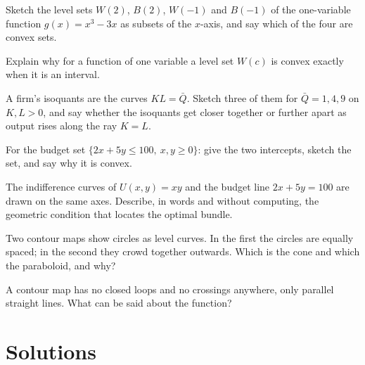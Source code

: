 \begin{problems}[resume]
  \item Sketch the level sets $W(2)$, $B(2)$, $W(-1)$ and $B(-1)$ of the
        one-variable function $g(x)=x^{3}-3x$ as subsets of the $x$-axis,
        and say which of the four are convex sets.
  \item Explain why for a function of one variable a level set
        $W(c)$ is convex exactly when it is an interval.
  \item A firm's isoquants are the curves $KL=\bar Q$. Sketch three of them
        for $\bar Q=1,4,9$ on $K,L>0$, and say whether the isoquants get
        closer together or further apart as output rises along the ray
        $K=L$.
  \item For the budget set $\{2x+5y\le100,\ x,y\ge0\}$: give the two
        intercepts, sketch the set, and say why it is convex.
  \item The indifference curves of $U(x,y)=xy$ and the budget line
        $2x+5y=100$ are drawn on the same axes. Describe, in words and
        without computing, the geometric condition that locates the optimal
        bundle.
  \item Two contour maps show circles as level curves. In the first the
        circles are equally spaced; in the second they crowd together
        outwards. Which is the cone and which the paraboloid, and why?
  \item A contour map has no closed loops and no crossings anywhere, only
        parallel straight lines. What can be said about the function?
\end{problems}

\section{Solutions}

